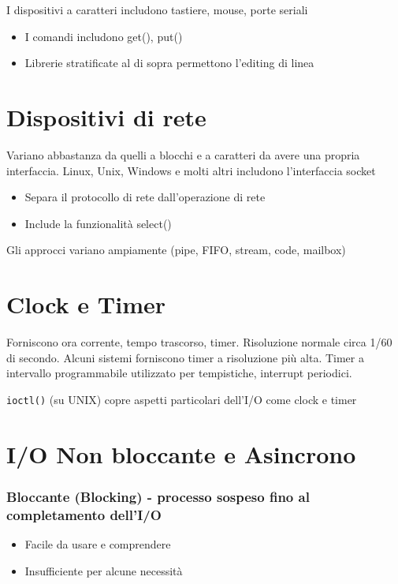 I dispositivi a caratteri includono tastiere, mouse, porte seriali
\begin{itemize}
  \item I comandi includono get(), put()
  \item Librerie stratificate al di sopra permettono l'editing di linea
\end{itemize}

\section{Dispositivi di rete}

Variano abbastanza da quelli a blocchi e a caratteri da avere una propria interfaccia.
Linux, Unix, Windows e molti altri includono l'interfaccia socket

\begin{itemize}
  \item Separa il protocollo di rete dall'operazione di rete
  \item Include la funzionalità select()
\end{itemize}
Gli approcci variano ampiamente (pipe, FIFO, stream, code, mailbox)

\section{Clock e Timer}

Forniscono ora corrente, tempo trascorso, timer.
Risoluzione normale circa 1/60 di secondo. Alcuni sistemi forniscono timer
a risoluzione più alta. Timer a intervallo programmabile utilizzato per tempistiche, interrupt periodici.

\verb|ioctl()| (su UNIX) copre aspetti particolari dell'I/O come clock e timer

\section{I/O Non bloccante e Asincrono}

\subsubsection{Bloccante (Blocking) - processo sospeso fino al completamento dell'I/O}
\begin{itemize}
  \item Facile da usare e comprendere
  \item Insufficiente per alcune necessità
\end{itemize}

